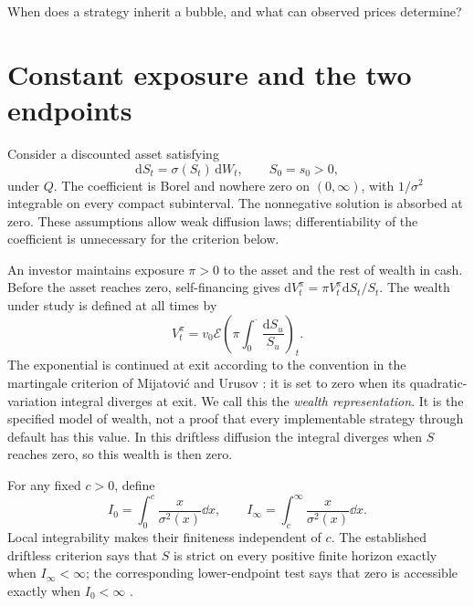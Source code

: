 {When does a strategy inherit a bubble, and what can observed prices determine?}

\section{Constant exposure and the two endpoints}\label{sec:classification}
Consider a discounted asset satisfying
\begin{equation}\label{eq:localvol}
 \mathrm{d}S_t=\sigma(S_t)\,\mathrm{d}W_t,\qquad S_0=s_0>0,
\end{equation}
under $Q$. The coefficient is Borel and nowhere zero on $(0,\infty)$, with
$1/\sigma^2$ integrable on every compact subinterval. The nonnegative solution
is absorbed at zero. These assumptions allow weak diffusion laws; differentiability
of the coefficient is unnecessary for the criterion below.

An investor maintains exposure $\pi>0$ to the asset and the rest of wealth in
cash. Before the asset reaches zero, self-financing gives
$\mathrm{d}V_t^\pi=\pi V_t^\pi\mathrm{d}S_t/S_t$. The wealth under study is
defined at all times by
\begin{equation}\label{eq:wealth}
 V_t^\pi=v_0\mathcal E\!\left(\pi\int_0^\cdot
                   \frac{\mathrm{d}S_u}{S_u}\right)_t .
\end{equation}
The exponential is continued at exit according to the convention in the
martingale criterion of Mijatovi\'c and Urusov
\cite{mijatovic2010martingale}: it is set to zero when its quadratic-variation
integral diverges at exit. We call this the \emph{wealth representation}.
It is the specified model of wealth, not a proof that every implementable
strategy through default has this value. In this driftless diffusion the
integral diverges when $S$ reaches zero, so this wealth is then zero.

For any fixed $c>0$, define
\begin{equation}\label{eq:integrals}
 I_0=\int_0^c\frac{x}{\sigma^2(x)}\dd x,
 \qquad I_\infty=\int_c^\infty\frac{x}{\sigma^2(x)}\dd x.
\end{equation}
Local integrability makes their finiteness independent of $c$. The established
driftless criterion says that $S$ is strict on every positive finite horizon
exactly when $I_\infty<\infty$; the corresponding lower-endpoint test says that
zero is accessible exactly when $I_0<\infty$
\cite{mijatovic2010martingale,karatzas2015distribution}.

